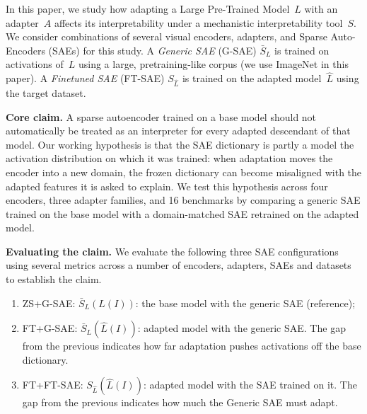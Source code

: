 In this paper, we study how adapting a Large Pre-Trained Model~$L$ with an adapter~$A$ affects its interpretability under a mechanistic interpretability tool~$S$.
We consider combinations of several visual encoders, adapters, and Sparse Auto-Encoders (SAEs) for this study. A \emph{Generic SAE} (G-SAE) $\bar{S}_L$ is trained on activations of~$L$ using a large, pretraining-like corpus (we use ImageNet in this paper). A \emph{Finetuned SAE} (FT-SAE) $S_{\hat{L}}$ is trained on the adapted model~$\hat{L}$ using the target dataset.

\noindent\textbf{Core claim.}
A sparse autoencoder trained on a base model should not automatically be treated as an
interpreter for every adapted descendant of that model.
Our working hypothesis is that the SAE dictionary is partly a model   the activation
distribution on which it was trained: when adaptation moves the encoder into a new domain,
the frozen dictionary can become misaligned with the adapted features it is asked to explain.
We test this hypothesis across four encoders, three adapter families, and 16 benchmarks by
comparing a generic SAE trained on the base model with a domain-matched SAE retrained on the
adapted model.

\noindent\textbf{Evaluating the claim.}
We evaluate the following three SAE configurations using several metrics across a number of encoders, adapters, SAEs and datasets to establish the claim.
\begin{enumerate}[leftmargin=5mm, nosep]
    \item {ZS+G-SAE}: $\bar{S}_L(L(I))$: the base model with the generic SAE (reference);
    \item {FT+G-SAE}: $\bar{S}_L(\hat{L}(I))$: adapted model with the generic SAE. The gap from the previous indicates how far adaptation pushes activations off the base dictionary.
    \item {FT+FT-SAE}: $S_{\hat{L}}(\hat{L}(I))$: adapted model with the SAE trained on it. The gap from the previous indicates how much the Generic SAE must adapt.
\end{enumerate}


